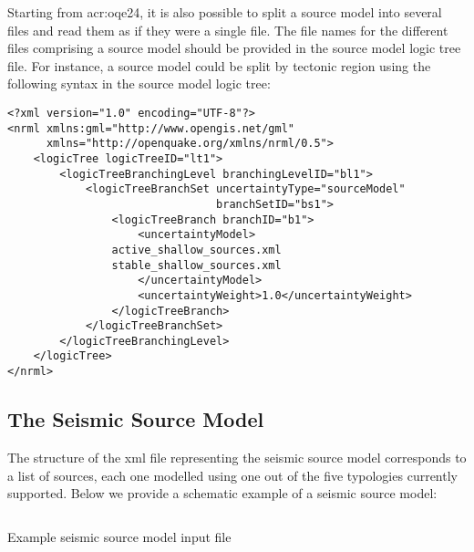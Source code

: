 Starting from \glsdesc{acr:oqe24}, it is also possible to split a source model
into several files and read them as if they were a single file. The file names
for the different files comprising a source model should be provided in the
source model logic tree file. For instance, a source model could be split by
tectonic region using the following syntax in the source model logic tree:

\begin{verbatim}
<?xml version="1.0" encoding="UTF-8"?>
<nrml xmlns:gml="http://www.opengis.net/gml"
      xmlns="http://openquake.org/xmlns/nrml/0.5">
    <logicTree logicTreeID="lt1">
        <logicTreeBranchingLevel branchingLevelID="bl1">
            <logicTreeBranchSet uncertaintyType="sourceModel"
                                branchSetID="bs1">
                <logicTreeBranch branchID="b1">
                    <uncertaintyModel>
		        active_shallow_sources.xml
		        stable_shallow_sources.xml
                    </uncertaintyModel>
                    <uncertaintyWeight>1.0</uncertaintyWeight>
                </logicTreeBranch>
            </logicTreeBranchSet>
        </logicTreeBranchingLevel>
    </logicTree>
</nrml>
\end{verbatim}


\subsection{The Seismic Source Model}

The structure of the xml file representing the seismic source model
corresponds to a list of sources, each one modelled using one out of the five
typologies currently supported. Below we provide a schematic example of a
seismic source model:

\begin{listing}[htbp]
  \inputminted[firstline=1,firstnumber=1,fontsize=\footnotesize,frame=single,linenos,bgcolor=lightgray]{xml}{oqum/hazard/verbatim/input_sslt.xml}
  \caption{Example seismic source model input file}
  \label{lst:input_ssm}
\end{listing}